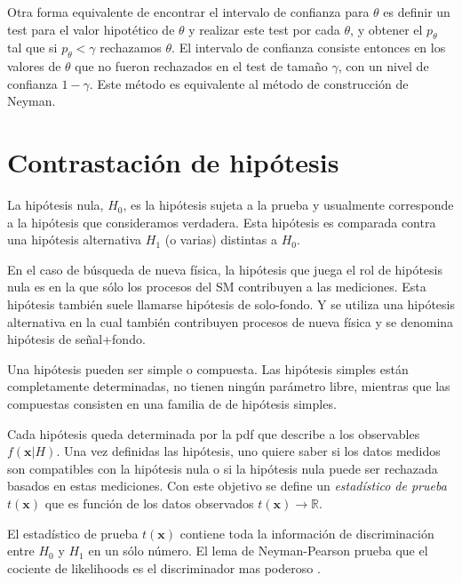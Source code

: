 
Otra forma equivalente de encontrar el intervalo de confianza para $\theta$ es
definir un test para el valor hipotético de $\theta$ y realizar este test por
cada $\theta$, y obtener el {\pvalue} $p_\theta$ tal que si $p_\theta < \gamma$
rechazamos $\theta$. El intervalo de confianza consiste entonces en los valores
de $\theta$ que no fueron rechazados en el test de tamaño $\gamma$, con un nivel
de confianza $1-\gamma$. Este método es equivalente al método de construcción de
Neyman.


\section{Contrastación de hipótesis}

La hipótesis nula, $H_0$, es la hipótesis sujeta a la prueba y usualmente
corresponde a la hipótesis que consideramos verdadera. Esta hipótesis es
comparada contra una hipótesis alternativa $H_1$ (o varias) distintas a $H_0$.

En el caso de búsqueda de nueva física, la hipótesis que juega el rol de
hipótesis nula es en la que sólo los procesos del SM contribuyen a las
mediciones. Esta hipótesis también suele llamarse hipótesis de solo-fondo. Y se
utiliza una hipótesis alternativa en la cual también contribuyen procesos de
nueva física y se denomina hipótesis de se\~nal+fondo.

Una hipótesis pueden ser simple o compuesta. Las hipótesis simples están
completamente determinadas, no tienen ningún parámetro libre, mientras que las
compuestas consisten en una familia de de hipótesis simples.

Cada hipótesis queda determinada por la pdf que describe a los observables
$f(\bm{x}|H)$.
Una vez definidas las hipótesis, uno quiere saber si los datos medidos son
compatibles con la hipótesis nula o si la hipótesis nula puede ser rechazada
basados en estas mediciones. Con este objetivo se define un \emph{estadístico de
  prueba} $t(\bm{x})$ que es función de los datos observados $t(\bm{x}) \to \mathbb{R}$.

El estadístico de prueba $t(\bm{x})$ contiene toda la información de
discriminación entre $H_0$ y $H_1$ en un sólo número. El lema de
Neyman-Pearson prueba que el cociente de likelihoods es el
discriminador mas poderoso . %

